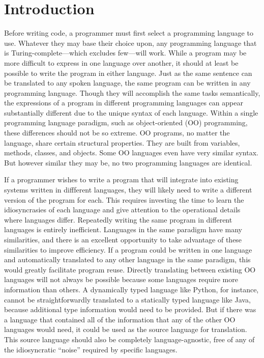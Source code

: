 \documentclass[10pt,conference]{IEEEtran}
\begin{document}
\section{Introduction}
Before writing code, a programmer must first select a programming language to 
use. Whatever they may base their choice upon, any programming 
language that is Turing-complete---which excludes few---will work. While a 
program may be more difficult to express in one 
language over another, it should at least be possible to write the program in 
either language. Just as the same sentence can be translated to any spoken 
language, the same program can be written in any programming language. Though 
they will accomplish the same tasks semantically, the expressions of a program 
in different programming languages can appear substantially different due to 
the unique syntax of each language. Within a single programming language 
paradigm, such as object-oriented (OO) programming, these differences should
not be so extreme. OO programs, no matter the language, share certain 
structural properties. They are built from variables, methods, classes, and
objects. Some OO languages even have very similar syntax. But however similar 
they may be, no two programming languages are identical.

If a programmer wishes to write a program that will integrate into 
existing systems written in diffferent languages, they will likely need to 
write a different version of the program for each. This 
requires investing the time to learn the idiosyncrasies of each language and 
give attention to the operational details where languages differ. Repeatedly 
writing the same program in different languages is entirely inefficient. 
Languages in the same paradigm have many similarities, and there is an 
excellent opportunity to take advantage of these similarities to improve 
efficiency. If a program could be written in one language and automatically 
translated to any other language in the same paradigm, this would greatly 
facilitate program reuse. Directly translating between existing 
OO languages will not always be possible because some languages 
require more information than others. A dynamically typed language like Python, 
for instance, cannot be straightforwardly translated to a statically typed 
language like Java, because additional type information would need to be 
provided. But if there was a language that contained all of the information 
that any of the other OO languages would need, it could be used as the source 
language for translation. This source language should also be completely 
language-agnostic, free of any of the idiosyncratic ``noise'' required by
specific languages.
\end{document}
